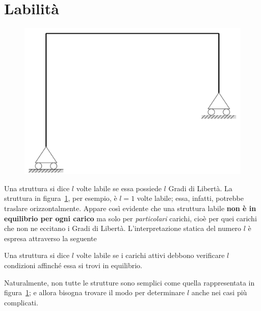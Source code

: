 \section{Labilità}
\renewcommand{\thefigure}{7~-~5}
\begin{figure}[ht]
\centering
\includegraphics[width=\textwidth]{Immagini/Parte_7/Figura7_5/Figura7_5.pdf}
\caption{}
\label{figura7-5}
\end{figure}
\noindent Una struttura si dice $l$ volte labile se essa possiede $l$ Gradi di Libertà. La struttura in figura~\ref{figura7-5}, per esempio, è $l=1$ volte labile; essa, infatti, potrebbe traslare orizzontalmente. Appare così evidente che una struttura labile \textbf{non è in equilibrio per ogni carico} ma solo per \emph{particolari} carichi, cioè per quei carichi che non ne eccitano i Gradi di Libertà. L'interpretazione statica del numero $l$ è espresa attraverso la seguente
\begin{prop}
Una struttura si dice $l$ volte labile se i carichi attivi debbono verificare $l$ condizioni affinché essa si trovi in equilibrio.
\end{prop}
\noindent Naturalmente, non tutte le strutture sono semplici come quella rappresentata in figura~\ref{figura7-5}; e allora bisogna trovare il modo per determinare $l$ anche nei casi più complicati.

